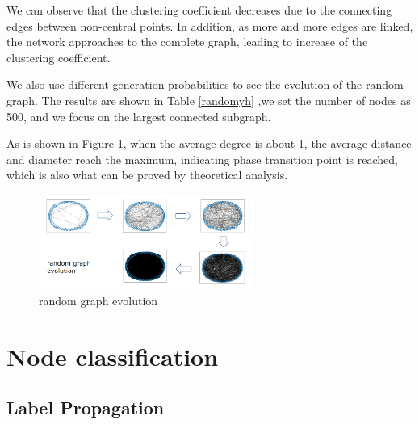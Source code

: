 \documentclass[fleqn,10pt]{SelfArx} %
\begin{document}
	We can observe that the clustering coefficient decreases due to the connecting edges between non-central points. In addition, as more and more edges are linked, the network approaches to the complete graph, leading to increase of the clustering coefficient.
	
	We also use different generation probabilities to see the evolution of the random graph. The results are shown in Table \ref{randomyh} ,we set the number of nodes as 500, and we focus on the largest connected subgraph.
	
	\begin{table}[]
		\centering
		\caption{random graph evolution}
		\label{randomyh}
	\end{table}
	
	As is shown in Figure \ref{rge}, when the average degree is about 1, the average distance and diameter reach the maximum, indicating phase transition point is reached, which is also what can be proved by  theoretical analysis. 
	
	\begin{figure}
		\centering
		\includegraphics[width=7cm]{figure/random evolution.png}
		\caption{random graph evolution}
		\label{rge}
	\end{figure}

\section{Node classification}

\subsection{Label Propagation}
\end{document}

